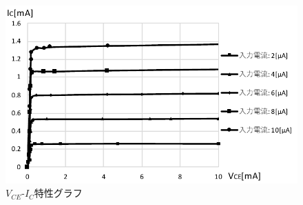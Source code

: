 \documentclass[uplatex,dvipdfmx,a4paper,js=standard, titlepage]{bxjsarticle}
\begin{document}
            \begin{figure}[ht]
                \begin{center}
                    \includegraphics[width=12cm]{graphs/VCE-IC_graph.pdf}
                    \caption{$V_{CE}$-$I_C$特性グラフ}
                    \label{fig:VCE-IC_graph}
                \end{center}
            \end{figure}
\end{document}
